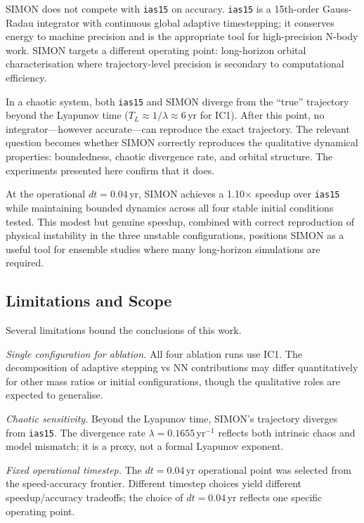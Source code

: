 \documentclass[12pt]{article}
\begin{document}
SIMON does not compete with \texttt{ias15} on accuracy. \texttt{ias15} is a 15th-order
Gauss-Radau integrator with continuous global adaptive timestepping; it conserves energy
to machine precision and is the appropriate tool for high-precision N-body work.
SIMON targets a different operating point: long-horizon orbital characterisation where
trajectory-level precision is secondary to computational efficiency.

In a chaotic system, both \texttt{ias15} and SIMON diverge from the ``true'' trajectory
beyond the Lyapunov time ($T_L \approx 1/\lambda \approx 6$\,yr for IC1). After this
point, no integrator---however accurate---can reproduce the exact trajectory. The relevant
question becomes whether SIMON correctly reproduces the qualitative dynamical properties:
boundedness, chaotic divergence rate, and orbital structure. The experiments presented here
confirm that it does.

At the operational $dt = 0.04$\,yr, SIMON achieves a 1.10$\times$ speedup over
\texttt{ias15} while maintaining bounded dynamics across all four stable initial conditions
tested. This modest but genuine speedup, combined with correct reproduction of physical
instability in the three unstable configurations, positions SIMON as a useful tool for
ensemble studies where many long-horizon simulations are required.

\subsection{Limitations and Scope}

Several limitations bound the conclusions of this work.

\textit{Single configuration for ablation.} All four ablation runs use IC1. The
decomposition of adaptive stepping vs NN contributions may differ quantitatively for
other mass ratios or initial configurations, though the qualitative roles are expected
to generalise.

\textit{Chaotic sensitivity.} Beyond the Lyapunov time, SIMON's trajectory diverges from
\texttt{ias15}. The divergence rate $\lambda = 0.1655$\,yr$^{-1}$ reflects both intrinsic
chaos and model mismatch; it is a proxy, not a formal Lyapunov exponent.

\textit{Fixed operational timestep.} The $dt=0.04$\,yr operational point was selected
from the speed-accuracy frontier. Different timestep choices yield different speedup/accuracy
tradeoffs; the choice of $dt=0.04$\,yr reflects one specific operating point.
\end{document}
